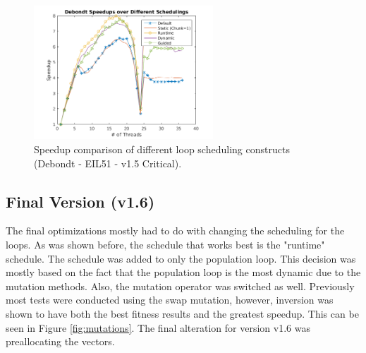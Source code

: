 \documentclass[10pt,letterpaper]{article}
\begin{document}
\begin{figure}
\centering
\includegraphics[width=0.6\textwidth]{../img/debondt_schedulers.png}
\caption{Speedup comparison of different loop scheduling constructs (Debondt - EIL51 - v1.5 Critical).}
\label{fig:schedules}
\end{figure}

\subsection{Final Version (v1.6)}
The final optimizations mostly had to do with changing the scheduling for the loops. As was shown before, the schedule that works best is the "runtime" schedule. The schedule was added to only the population loop. This decision was mostly based on the fact that the population loop is the most dynamic due to the mutation methods. Also, the mutation operator was switched as well. Previously most tests were conducted using the swap mutation, however, inversion was shown to have both the best fitness results and the greatest speedup. This can be seen in Figure \ref{fig:mutations}. The final alteration for version v1.6 was preallocating the vectors.
\end{document}
